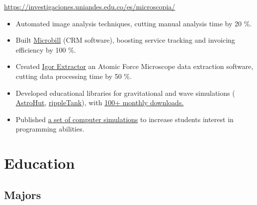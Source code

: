 \documentclass[11pt, letterpaper, sans]{moderncv}
\begin{document}
    {
        \url{https://investigaciones.uniandes.edu.co/es/microscopia/}
        \vspace{3pt}
        \begin{itemize}
            \item Automated image analysis techniques, cutting manual analysis time by 20 \%.
            \item Built \href{https://github.com/jsbarbosa/microbill}{\color{color1} Microbill} (CRM software), boosting service tracking and invoicing efficiency by 100 \%.
            \item Created \href{https://github.com/jsbarbosa/SPM}{\color{color1} Igor Extractor} an Atomic Force Microscope data extraction software, cutting data processing time by 50 \%.
        \end{itemize}
    }

    {
        \vspace{3pt}
        \begin{itemize}
            \item Developed educational libraries for gravitational and wave simulations (\href{https://jsbarbosa.github.io/astrohut/}{\color{color1} AstroHut}, \href{https://jsbarbosa.github.io/rippleTank/}{\color{color1} rippleTank}), with \href{https://pypistats.org/packages/astrohut}{\color{color1} 100+ monthly downloads.}
            \item Published \href{https://github.com/ComputoCienciasUniandes/Demonstrations}{\color{color1} a set of computer simulations} to increase students interest in programming abilities.
        \end{itemize} 
    }

\section{Education}
\subsection{Majors}
\vspace{5pt}
\vspace{5pt}
\end{document}
